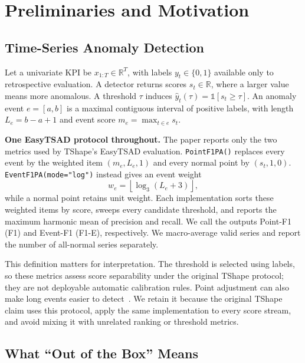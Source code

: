 \documentclass[conference]{IEEEtran}
\newcommand{\pfone}{Point-F1}
\newcommand{\efone}{Event-F1}
\begin{document}
\section{Preliminaries and Motivation}

\subsection{Time-Series Anomaly Detection}

Let a univariate KPI be $x_{1:T}\in\mathbb{R}^{T}$, with labels $y_t\in\{0,1\}$ available only to retrospective evaluation. A detector returns scores $s_t\in\mathbb{R}$, where a larger value means more anomalous. A threshold $\tau$ induces $\hat y_t(\tau)=\mathbb{1}[s_t\geq\tau]$. An anomaly event $e=[a,b]$ is a maximal contiguous interval of positive labels, with length $L_e=b-a+1$ and event score $m_e=\max_{t\in e}s_t$.

\textbf{One EasyTSAD protocol throughout.}
The paper reports only the two metrics used by TShape's EasyTSAD evaluation. \texttt{PointF1PA()} replaces every event by the weighted item $(m_e,L_e,1)$ and every normal point by $(s_t,1,0)$. \texttt{EventF1PA(mode="log")} instead gives an event weight
\begin{equation}
  w_e=\left\lfloor \log_3(L_e+3)\right\rfloor,
  \label{eq:event-weight}
\end{equation}
while a normal point retains unit weight. Each implementation sorts these weighted items by score, sweeps every candidate threshold, and reports the maximum harmonic mean of precision and recall. We call the outputs \pfone{} (F1) and \efone{} (F1-E), respectively. We macro-average valid series and report the number of all-normal series separately.

This definition matters for interpretation. The threshold is selected using labels, so these metrics assess score separability under the original TShape protocol; they are not deployable automatic calibration rules. Point adjustment can also make long events easier to detect~\cite{kim2022rigorous}. We retain it because the original TShape claim uses this protocol, apply the same implementation to every score stream, and avoid mixing it with unrelated ranking or threshold metrics.

\subsection{What ``Out of the Box'' Means}
\end{document}
